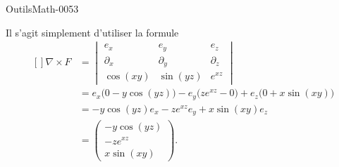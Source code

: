 
\begin{corrige}{OutilsMath-0053}

    Il s'agit simplement d'utiliser la formule
    \begin{equation}
        \begin{aligned}[]
            \nabla\times F&=\begin{vmatrix}
                 e_x   &   e_y    &   e_z    \\
                \partial_x    &   \partial_y    &   \partial_z    \\
                \cos(xy)    &   \sin(yz)    &    e^{xz}
            \end{vmatrix}\\
            &=
            e_x\big( 0-y\cos(yz) \big)-e_y\big( z e^{xz}-0 \big)+e_z\big( 0+x\sin(xy) \big)\\
            &=-y\cos(yz)e_x-z e^{xz}e_y+x\sin(xy)e_z\\
            &=\begin{pmatrix}
                -y\cos(yz)    \\ 
                -z e^{xz}    \\ 
                x\sin(xy)    
            \end{pmatrix}.
        \end{aligned}
    \end{equation}

\end{corrige}
